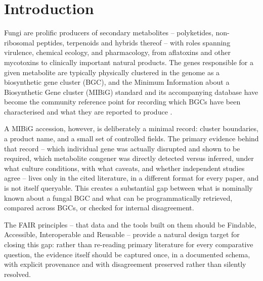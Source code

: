 \section{Introduction}

Fungi are prolific producers of secondary metabolites -- polyketides, non-ribosomal peptides,
terpenoids and hybrids thereof -- with roles spanning virulence, chemical ecology, and pharmacology,
from aflatoxins and other mycotoxins to clinically important natural products. The genes responsible
for a given metabolite are typically physically clustered in the genome as a biosynthetic gene
cluster (BGC), and the Minimum Information about a Biosynthetic Gene cluster (MIBiG) standard and
its accompanying database have become the community reference point for recording which BGCs have
been characterised and what they are reported to produce \citep{terlouw2023mibig}.

A MIBiG accession, however, is deliberately a minimal record: cluster boundaries, a product name,
and a small set of controlled fields. The primary evidence behind that record -- which individual
gene was actually disrupted and shown to be required, which metabolite congener was directly
detected versus inferred, under what culture conditions, with what caveats, and whether independent
studies agree -- lives only in the cited literature, in a different format for every paper, and is
not itself queryable. This creates a substantial gap between what is nominally known about a fungal
BGC and what can be programmatically retrieved, compared across BGCs, or checked for internal
disagreement.


The FAIR principles -- that data and the tools built on them should be Findable, Accessible,
Interoperable and Reusable \citep{wilkinson2016fair} -- provide a natural design target for closing
this gap: rather than re-reading primary literature for every comparative question, the evidence
itself should be captured once, in a documented schema, with explicit provenance and with
disagreement preserved rather than silently resolved.

